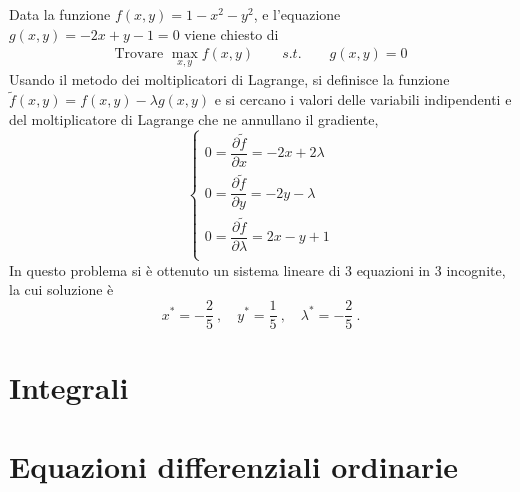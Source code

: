 \begin{example} Data la funzione $f(x,y) = 1 - x^2 - y^2$, e l'equazione $g(x,y) = -2x + y - 1 = 0$ viene chiesto di 
\begin{equation}
\begin{aligned}
    \text{Trovare } \max_{x,y} f(x,y) \qquad s.t. \qquad g(x,y) = 0
\end{aligned}
\end{equation}
    Usando il metodo dei moltiplicatori di Lagrange, si definisce la funzione $\tilde{f}(x,y) = f(x,y) - \lambda g(x,y)$ e si cercano i valori delle variabili indipendenti e del moltiplicatore di Lagrange che ne annullano il gradiente,
    \begin{equation}
        \begin{cases}
            0 = \dfrac{\partial \tilde{f}}{\partial x      } = -2x + 2 \lambda\\ 
            0 = \dfrac{\partial \tilde{f}}{\partial y      } = -2y - \lambda \\ 
            0 = \dfrac{\partial \tilde{f}}{\partial \lambda} = 2x - y + 1 \\ 
        \end{cases}
    \end{equation}
    In questo problema si è ottenuto un sistema lineare di 3 equazioni in 3 incognite, la cui soluzione è 
    \begin{equation}
        x^* = -\frac{2}{5} \ , \quad y^* = \frac{1}{5} \ , \quad \lambda^* = -\frac{2}{5} \ . 
    \end{equation}
\end{example}

\begin{example}
\end{example}

\begin{example}
\end{example}

\chapter{Integrali}
\section{}

\chapter{Equazioni differenziali ordinarie}
